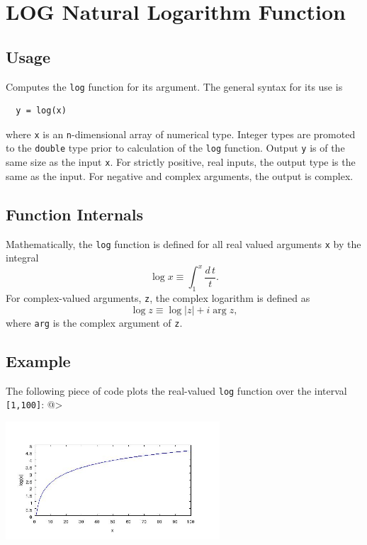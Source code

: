 \section{LOG Natural Logarithm Function}

\subsection{Usage}

Computes the \verb|log| function for its argument.  The general
syntax for its use is
\begin{verbatim}
  y = log(x)
\end{verbatim}
where \verb|x| is an \verb|n|-dimensional array of numerical type.
Integer types are promoted to the \verb|double| type prior to
calculation of the \verb|log| function.  Output \verb|y| is of the
same size as the input \verb|x|. For strictly positive, real inputs, 
the output type is the same as the input.
For negative and complex arguments, the output is complex.
\subsection{Function Internals}

Mathematically, the \verb|log| function is defined for all real
valued arguments \verb|x| by the integral
\[
  \log x \equiv \int_1^{x} \frac{d\,t}{t}.
\]
For complex-valued arguments, \verb|z|, the complex logarithm is
defined as
\[
  \log z \equiv \log |z| + i \arg z,
\]
where \verb|arg| is the complex argument of \verb|z|.
\subsection{Example}

The following piece of code plots the real-valued \verb|log|
function over the interval \verb|[1,100]|:
@>


\centerline{\includegraphics[width=8cm]{logplot}}

